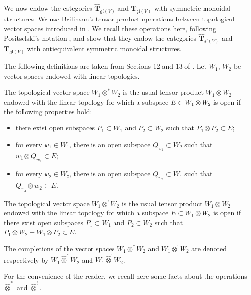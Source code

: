 \documentclass[12pt,reqno]{amsart}
\theoremstyle{definition}
\theoremstyle{remark}
\begin{document}
	We now endow the categories $\widehat{\mathbf{T}}_{\mathfrak{gl}(V)}$ and $\mathbf{T}_{\mathfrak{gl}(V)}$ with symmetric monoidal structures. We use Beilinson's tensor product operations between topological vector spaces introduced in \cite{Bei}.
	We recall these operations here, following Positselski's notation \cite{Po}, and show that they endow the categories $\widehat{\mathbf{T}}_{\mathfrak{gl}(V)}$ and $\mathbf{T}_{\mathfrak{gl}(V)}$ with antiequivalent symmetric monoidal structures.
	
	The following definitions are taken from  Sections 12 and 13 of \cite{Po}. Let $W_1$, $W_2$ be vector spaces endowed with linear topologies.
	
	The topological vector space $W_1 \otimes^\ast W_2$ is the usual tensor product $W_1 \otimes W_2$ endowed with the linear topology for which a subspace $E\subset W_1 \otimes W_2$ is open if the following properties hold:
	\begin{itemize}
	    \item there exist open subspaces $P_1 \subset W_1$ and $P_2 \subset W_2$ such that $P_1 \otimes P_2 \subset E$;
	    \item for every $w_1 \in W_1$, there is an open subspace $Q_{w_1}\subset W_2$ such that 
	    $w_1 \otimes Q_{w_1} \subset E$;
	    \item for every $w_2 \in W_2$, there is an open subspace $Q_{w_2}\subset W_1$ such that 
	    $Q_{w_2}\otimes w_2 \subset E$.
	\end{itemize}
	    

	
	The topological vector space $W_1 \otimes^! W_2$ is the usual tensor product $W_1 \otimes W_2$ endowed with the linear topology for which a subspace $E\subset W_1 \otimes W_2$ is open if there exist open subspaces $P_1 \subset W_1$ and $P_2 \subset W_2$ such that $P_1 \otimes W_2 + W_1 \otimes P_2 \subset E$.
	
	The completions of the vector spaces $W_1 \otimes^\ast W_2$ and $W_1 \otimes^! W_2$ are denoted respectively by $W_1 \widehat{\otimes}^\ast W_2$ and $W_1 \widehat{\otimes}^! W_2$.
	
	For the convenience of the reader, we recall here some facts about the operations $\widehat{\otimes}^\ast$ and $\widehat{\otimes}^!$.
	
\end{document}
